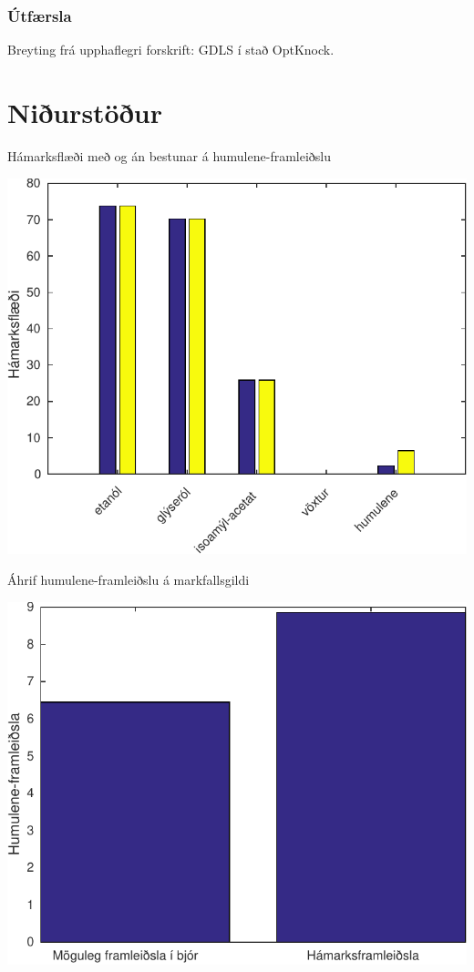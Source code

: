 \documentclass[11pt]{article}
\makeatletter
\newenvironment{figureonecolumn}{\begin{minipage}{\linewidth}\begin{center}\def\@captype{figure}}{\end{center}\end{minipage}}
\makeatother
\begin{document}
\begin{multicols}{2}
\subsubsection{Útfærsla}
Breyting frá upphaflegri forskrift: GDLS \cite{lun2009large} í stað OptKnock.
\section{Niðurstöður}

\begin{figureonecolumn}
\caption{Hámarksflæði með og án bestunar á humulene-framleiðslu}
\includegraphics[width=\linewidth]{Pics/BrewingMetMaxFlow}
\end{figureonecolumn}

\begin{figureonecolumn}
\caption{Áhrif humulene-framleiðslu á markfallsgildi}
\includegraphics[width=\linewidth]{Pics/ComparativeProduction}
\end{figureonecolumn}


\end{multicols}
\end{document}
